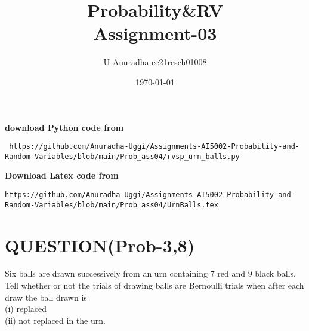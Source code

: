 \documentclass[journal,12pt,twocolumn]{IEEEtran}
\title{Probability\&RV \\ Assignment-03}
\author{U Anuradha-ee21resch01008}
\date{\today}
\begin{document}
\maketitle
\newpage
\bigskip
\renewcommand{\thefigure}{\theenumi}
\renewcommand{\thetable}{\theenumi}
\textbf{download Python code from}
\begin{lstlisting}
 https://github.com/Anuradha-Uggi/Assignments-AI5002-Probability-and-Random-Variables/blob/main/Prob_ass04/rvsp_urn_balls.py
\end{lstlisting}
\textbf{Download Latex code from}
\begin{lstlisting}
https://github.com/Anuradha-Uggi/Assignments-AI5002-Probability-and-Random-Variables/blob/main/Prob_ass04/UrnBalls.tex
\end{lstlisting}
\section{QUESTION(Prob-3,8)}
Six balls are drawn successively from an
urn containing 7 red and 9 black balls. Tell
whether or not the trials of drawing balls are
Bernoulli trials when after each draw the ball
drawn is\\
(i) replaced\\
(ii) not replaced in the urn.
\end{document}
